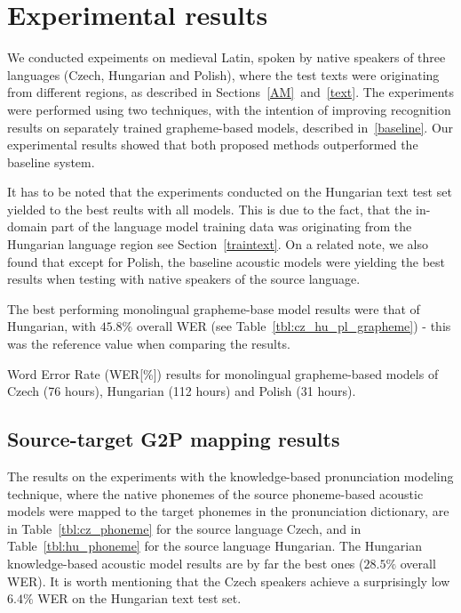 \documentclass[runningheads,a4paper]{llncs}
\begin{document}
\section{Experimental results}\label{results}
We conducted expeiments on medieval Latin, spoken by native speakers of three languages (Czech, Hungarian and Polish), where the test texts were originating from different regions, as described in Sections~\ref{AM}~and~\ref{text}.
The experiments were performed using two techniques, with the intention of improving recognition results on separately trained grapheme-based models, described in~\ref{baseline}.
Our experimental results showed that both proposed methods outperformed the baseline system.

It has to be noted that the experiments conducted on the Hungarian text test set yielded to the best reults with all models.
This is due to the fact, that the in-domain part of the language model training data was originating from the Hungarian language region see Section~\ref{traintext}.
On a related note, we also found that except for Polish, the baseline acoustic models were yielding the best results when testing with native speakers of the source language.

The best performing monolingual grapheme-base model results were that of Hungarian, with $45.8\%$ overall WER (see Table~\ref{tbl:cz_hu_pl_grapheme}) - this was the reference value when comparing the results.
\begin{table}
\centering
\caption{Word Error Rate (WER[\%]) results for monolingual grapheme-based models of Czech (76 hours), Hungarian (112 hours) and Polish (31 hours).}
\label{tbl:cz_hu_pl_grapheme}
\end{table}

\subsection{Source-target G2P mapping results}
The results on the experiments with the knowledge-based pronunciation modeling technique, where the native phonemes of the source phoneme-based acoustic models were mapped to the target phonemes in the pronunciation dictionary, are in Table~\ref{tbl:cz_phoneme} for the source language Czech, and in Table~\ref{tbl:hu_phoneme} for the source language Hungarian.
The Hungarian knowledge-based acoustic model results are by far the best ones ($28.5\%$ overall WER).
It is worth mentioning that the Czech speakers achieve a surprisingly low $6.4\%$ WER on the Hungarian text test set.
\end{document}

